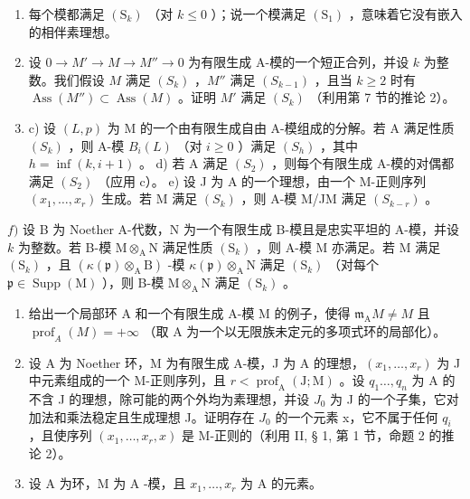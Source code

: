\begin{enumerate}
\def\labelenumi{\alph{enumi})}
\item
  每个模都满足 \((\mathrm{S}_{k})\) （对 \(k \leqslant 0\) ）；说一个模满足 \((\mathrm{S}_{1})\) ，意味着它没有嵌入的相伴素理想。
\item
  设 \(0 \to M' \to M \to M'' \to 0\) 为有限生成 A-模的一个短正合列，并设 \(k\) 为整数。我们假设 \(M\) 满足 \((S_k)\) ，\(M''\) 满足 \((S_{k-1})\) ，且当 \(k \geqslant 2\) 时有 \(\operatorname{Ass}(M'') \subset \operatorname{Ass}(M)\) 。证明 \(M'\) 满足 \((S_k)\) （利用第 7 节的推论 2）。
\item
  c) 设 \((L,p)\) 为 M 的一个由有限生成自由 A-模组成的分解。若 A 满足性质 \((S_{k})\) ，则 A-模 \(B_{i}(L)\) （对 \(i \geqslant 0\) ）满足 \((S_{h})\) ，其中 \(h = \inf(k,i+1)\) 。 d) 若 A 满足 \((S_{2})\) ，则每个有限生成 A-模的对偶都满足 \((S_{2})\) （应用 c）。 e) 设 J 为 A 的一个理想，由一个 M-正则序列 \((x_{1},\ldots,x_{r})\) 生成。若 M 满足 \((S_{k})\) ，则 A-模 M/JM 满足 \((S_{k-r})\) 。
\end{enumerate}

\(f)\) 设 B 为 Noether A-代数，N 为一个有限生成 B-模且是忠实平坦的 A-模，并设 \(k\) 为整数。若 B-模 \(\mathrm{M} \otimes_{\mathrm{A}} \mathrm{N}\) 满足性质 \((\mathrm{S}_k)\) ，则 A-模 M 亦满足。若 M 满足 \((\mathrm{S}_k)\) ，且 \((\kappa(\mathfrak{p}) \otimes_{\mathrm{A}} \mathrm{B})\) -模 \(\kappa(\mathfrak{p}) \otimes_{\mathrm{A}} \mathrm{N}\) 满足 \((\mathrm{S}_k)\) （对每个 \(\mathfrak{p} \in \operatorname{Supp}(\mathrm{M})\) ），则 B-模 \(\mathrm{M} \otimes_{\mathrm{A}} \mathrm{N}\) 满足 \((\mathrm{S}_k)\) 。

\begin{enumerate}
\def\labelenumi{\arabic{enumi})}
\setcounter{enumi}{8}
\item
  给出一个局部环 A 和一个有限生成 A-模 M 的例子，使得 \(\mathfrak{m}_{\mathrm{A}}M \neq M\) 且 \(\operatorname{prof}_{A}(M) = +\infty\) （取 A 为一个以无限族未定元的多项式环的局部化）。
\item
  设 A 为 Noether 环，M 为有限生成 A-模，J 为 A 的理想，\((x_{1},\ldots,x_{r})\) 为 J 中元素组成的一个 M-正则序列，且 \(r < \operatorname{prof}_{\mathrm{A}}(\mathrm{J};\mathrm{M})\) 。设 \(q_{1}\ldots,q_{n}\) 为 A 的不含 J 的理想，除可能的两个外均为素理想，并设 \(J_{0}\) 为 J 的一个子集，它对加法和乘法稳定且生成理想 J。证明存在 \(J_{0}\) 的一个元素 x，它不属于任何 \(q_{i}\) ，且使序列 \((x_{1},\ldots,x_{r},x)\) 是 M-正则的（利用 II, § 1, 第 1 节，命题 2 的推论 2）。
\item
  设 \(\mathrm{A}\) 为环，M 为 \(\mathrm{A}\) -模，且 \(x_{1},\ldots ,x_{r}\) 为 \(\mathrm{A}\) 的元素。
\end{enumerate}

